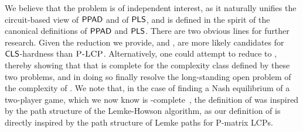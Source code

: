 We believe that the \EOPL problem is of independent interest, as it naturally
unifies the circuit-based view of $\mathsf{PPAD}$ and of $\mathsf{PLS}$, and is defined
in the spirit of the canonical definitions of $\mathsf{PPAD}$ and $\mathsf{PLS}$.  There
are two obvious lines for further research.  Given the reduction we provide,
\EOPL and \EOML, are more likely candidates for $\mathsf{CLS}$-hardness than $\textsc{P-LCP}$. 
Alternatively, one could attempt to reduce \EOPL to \PLCP, thereby showing that
that \PLCP is complete for the complexity class defined by these two problems,
and in doing so finally resolve the long-standing open problem of the complexity
of \PLCP.
We note that, in the case of finding a Nash equilibrium of a two-player game,
which we now know is
\PPAD-complete~\cite{chen2009settling,daskalakis2009complexity}, the definition
of \PPAD was inspired by the path structure of the Lemke-Howson algorithm, as
our definition of \EOPL is directly inspired by the path structure of Lemke
paths for P-matrix LCPs.






